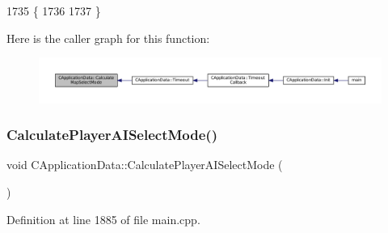 \begin{DoxyCode}
1735                                              \{
1736 
1737 \}
\end{DoxyCode}
Here is the caller graph for this function\+:
\nopagebreak
\begin{figure}[H]
\begin{center}
\leavevmode
\includegraphics[width=350pt]{classCApplicationData_a3c481d6483d165488596144a4bcf95cf_icgraph}
\end{center}
\end{figure}
\hypertarget{classCApplicationData_afbd3d397ba6bb36452458cf8f62ef9dc}{}\label{classCApplicationData_afbd3d397ba6bb36452458cf8f62ef9dc} 
\subsubsection{\texorpdfstring{Calculate\+Player\+A\+I\+Select\+Mode()}{CalculatePlayerAISelectMode()}}
{\footnotesize\ttfamily void C\+Application\+Data\+::\+Calculate\+Player\+A\+I\+Select\+Mode (\begin{DoxyParamCaption}{ }\end{DoxyParamCaption})\hspace{0.3cm}{\ttfamily [protected]}}



Definition at line 1885 of file main.\+cpp.



